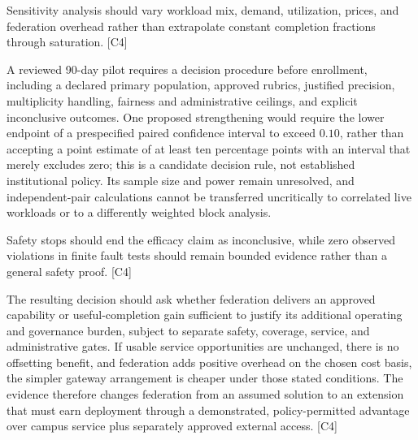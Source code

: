 \documentclass[11pt]{article}
\begin{document}
Sensitivity analysis should vary workload mix, demand, utilization, prices, and federation overhead rather than extrapolate constant completion fractions through saturation. [C4]

A reviewed 90-day pilot requires a decision procedure before enrollment, including a declared primary population, approved rubrics, justified precision, multiplicity handling, fairness and administrative ceilings, and explicit inconclusive outcomes. One proposed strengthening would require the lower endpoint of a prespecified paired confidence interval to exceed $0.10$, rather than accepting a point estimate of at least ten percentage points with an interval that merely excludes zero; this is a candidate decision rule, not established institutional policy. Its sample size and power remain unresolved, and independent-pair calculations cannot be transferred uncritically to correlated live workloads or to a differently weighted block analysis.

Safety stops should end the efficacy claim as inconclusive, while zero observed violations in finite fault tests should remain bounded evidence rather than a general safety proof. [C4]

The resulting decision should ask whether federation delivers an approved capability or useful-completion gain sufficient to justify its additional operating and governance burden, subject to separate safety, coverage, service, and administrative gates. If usable service opportunities are unchanged, there is no offsetting benefit, and federation adds positive overhead on the chosen cost basis, the simpler gateway arrangement is cheaper under those stated conditions. The evidence therefore changes federation from an assumed solution to an extension that must earn deployment through a demonstrated, policy-permitted advantage over campus service plus separately approved external access. [C4]
\end{document}
